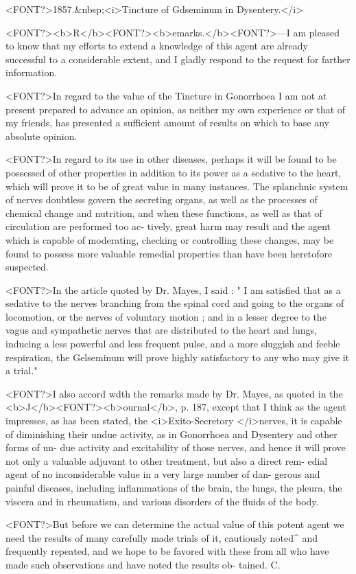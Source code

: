 <FONT?>1857.&nbsp;<i>Tincture of Gdseminum in Dysentery.</i>

<FONT?><b>R</b><FONT?><b>emarks.</b><FONT?>---I am pleased to know that my efforts to extend a knowledge
of this agent are already successful to a considerable extent, and I
gladly respond to the request for farther information.

<FONT?>In regard to the value of the Tincture in Gonorrhoea I am not at
present prepared to advance an opinion, as neither my own experience
or that of my friends, has presented a sufficient amount of results on
which to base any absolute opinion.

<FONT?>In regard to its use in other diseases, perhaps it will be found to be
possessed of other properties in addition to its power as a sedative to
the heart, which will prove it to be of great value in many instances.
The splanchnic system of nerves doubtless govern the secreting organs,
as well as the processes of chemical change and nutrition, and when
these functions, as well as that of circulation are performed too ac-
tively, great harm may result and the agent which is capable of
moderating, checking or controlling these changes, may be found to
possess more valuable remedial properties than have been heretofore
suspected.

<FONT?>In the article quoted by Dr. Mayes, I said : " I am satisfied that as
a sedative to the nerves branching from the spinal cord and going to
the organs of locomotion, or the nerves of voluntary motion ; and in a
lesser degree to the vagus and sympathetic nerves that are distributed
to the heart and lungs, inducing a less powerful and less frequent pulse,
and a more sluggish and feeble respiration, the Gelseminum will prove
highly satisfactory to any who may give it a trial."

<FONT?>I also accord wdth the remarks made by Dr. Mayes, as quoted in the
<b>J</b><FONT?><b>ournal</b>, p. 187, except that I think as the agent impresses, as has
been stated, the <i>Exito-Secretory </i>nerves, it is capable of diminishing their
undue activity, as in Gonorrhoea and Dysentery and other forms of un-
due activity and excitability of those nerves, and hence it will prove
not only a valuable adjuvant to other treatment, but also a direct rem-
edial agent of no inconsiderable value in a very large number of dan-
gerous and painful diseases, including inflammations of the brain, the
lungs, the pleura, the viscera and in rheumatism, and various disorders
of the fluids of the body.

<FONT?>But before we can determine the actual value of this potent agent
we need the results of many carefully made trials of it, cautiously noted^
and frequently repeated, and we hope to be favored with these from
all who have made such observations and have noted the results ob-
tained. C.\endinput
